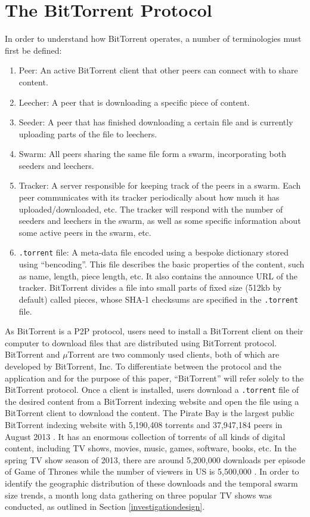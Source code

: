 \documentclass[conference]{IEEEtran}
\begin{document}
\section{The BitTorrent Protocol}
In order to understand how BitTorrent operates, a number of terminologies must first be defined:
\begin{enumerate}
\item Peer: An active BitTorrent client that other peers can connect with to share content.
\item Leecher: A peer that is downloading a specific piece of content.
\item Seeder: A peer that has finished downloading a certain file and is currently uploading parts of the file to leechers.
\item Swarm: All peers sharing the same file form a swarm, incorporating both seeders and leechers.
\item Tracker: A server responsible for keeping track of the peers in a swarm. Each peer communicates with its tracker periodically about how much it has uploaded/downloaded, etc. The tracker will respond with the number of seeders and leechers in the swarm, as well as some specific information about some active peers in the swarm, etc.
\item \texttt{.torrent} file: A meta-data file encoded using a bespoke dictionary stored using ``bencoding''. This file describes the basic properties of the content, such as name, length, piece length, etc. It also contains the announce URL of the tracker. BitTorrent divides a file into small parts of fixed size (512kb by default) called pieces, whose SHA-1 checksums are specified in the \texttt{.torrent} file.
\end{enumerate}



As BitTorrent is a P2P protocol, users need to install a BitTorrent client on their computer to download files that are distributed using BitTorrent protocol. BitTorrent and $\mu$Torrent are two commonly used clients, both of which are developed by BitTorrent, Inc. To differentiate between the protocol and the application and for the purpose of this paper, ``BitTorrent'' will refer solely to the BitTorrent protocol. Once a client is installed, users download a \texttt{.torrent} file of the desired content from a BitTorrent indexing website and open the file using a BitTorrent client to download the content. The Pirate Bay is the largest public BitTorrent indexing website with 5,190,408 torrents and 37,947,184 peers in August 2013 \cite{tpb}. It has an enormous collection of torrents of all kinds of digital content, including TV shows, movies, music, games, software, books, etc. In the spring TV show season of 2013, there are around 5,200,000 downloads per episode of Game of Thrones while the number of viewers in US is 5,500,000 \cite{torrentfreak}. In order to identify the geographic distribution of these downloads and the temporal swarm size trends, a month long data gathering on three popular TV shows was conducted, as outlined in Section \ref{investigationdesign}.
\end{document}
